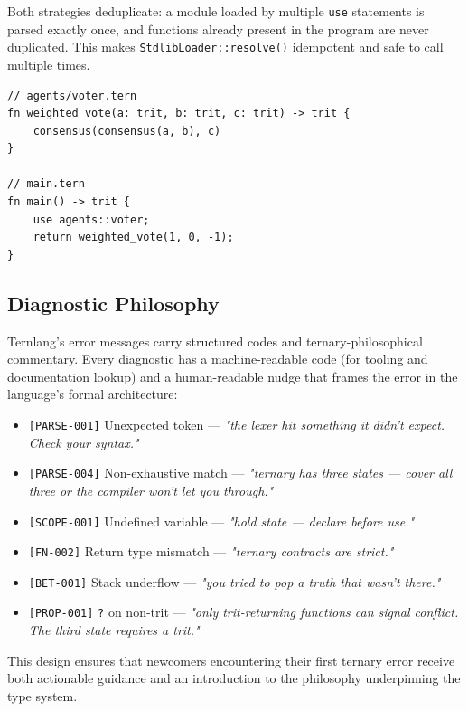 \documentclass[journal,10pt,twocolumn]{IEEEtran}
\begin{document}
Both strategies deduplicate: a module loaded by multiple \texttt{use}
statements is parsed exactly once, and functions already present in the
program are never duplicated. This makes \texttt{StdlibLoader::resolve()}
idempotent and safe to call multiple times.

\begin{lstlisting}[caption={Cross-file module import}]
// agents/voter.tern
fn weighted_vote(a: trit, b: trit, c: trit) -> trit {
    consensus(consensus(a, b), c)
}

// main.tern
fn main() -> trit {
    use agents::voter;
    return weighted_vote(1, 0, -1);
}
\end{lstlisting}

\subsection{Diagnostic Philosophy}
\label{subsec:diagnostics}

Ternlang's error messages carry structured codes and ternary-philosophical
commentary. Every diagnostic has a machine-readable code (for tooling and
documentation lookup) and a human-readable nudge that frames the error in
the language's formal architecture:

\begin{itemize}
  \item \texttt{[PARSE-001]} Unexpected token — \emph{"the lexer hit something
        it didn't expect. Check your syntax."}
  \item \texttt{[PARSE-004]} Non-exhaustive match — \emph{"ternary has three
        states — cover all three or the compiler won't let you through."}
  \item \texttt{[SCOPE-001]} Undefined variable — \emph{"hold state — declare
        before use."}
  \item \texttt{[FN-002]} Return type mismatch — \emph{"ternary contracts are
        strict."}
  \item \texttt{[BET-001]} Stack underflow — \emph{"you tried to pop a truth
        that wasn't there."}
  \item \texttt{[PROP-001]} \texttt{?} on non-trit — \emph{"only trit-returning
        functions can signal conflict. The third state requires a trit."}
\end{itemize}

This design ensures that newcomers encountering their first ternary error
receive both actionable guidance and an introduction to the philosophy
underpinning the type system.
\end{document}
